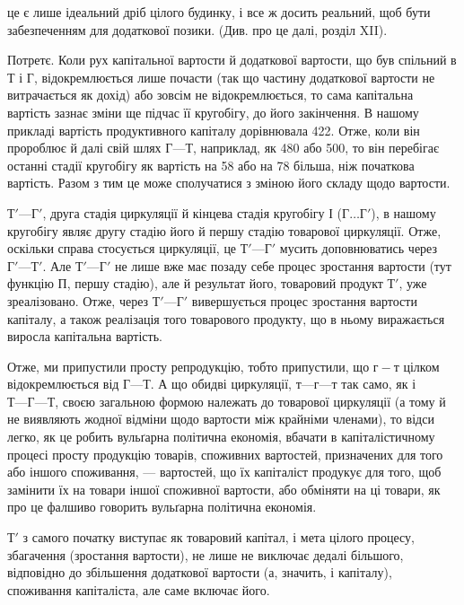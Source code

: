 \parcont{}  %
це є лише ідеальний дріб цілого будинку, і все ж досить реальний, щоб
бути забезпеченням для додаткової позики. (Див. про це далі, розділ XII).

Потретє. Коли рух капітальної вартости й додаткової вартости, що
був спільний в $Т$ і $Г$, відокремлюється лише почасти (так що частину
додаткової вартости не витрачається як дохід) або зовсім не відокремлюється,
то сама капітальна вартість зазнає зміни ще підчас її кругобігу,
до його закінчення. В нашому прикладі вартість продуктивного капіталу
дорівнювала 422. Отже, коли він пророблює й далі свій шлях
$Г — Т$, наприклад, як 480 або 500, то він перебігає
останні стадії кругобігу як вартість на 58 або на 78
більша, ніж початкова вартість. Разом з тим це може сполучатися з зміною
його складу щодо вартости.

$Т' — Г'$, друга стадія циркуляції й кінцева стадія кругобігу І ($ Г\dots{} Г'$),
в нашому кругобігу являє другу стадію його й першу стадію товарової
циркуляції. Отже, оскільки справа стосується циркуляції, це $Т' — Г'$ мусить
доповнюватись через $Г' — Т'$. Але $Т' — Г'$ не лише вже має позаду себе процес
зростання вартости (тут функцію $П$, першу стадію), але й результат його,
товаровий продукт $Т'$, уже зреалізовано. Отже, через $Т' — Г'$ вивершується
процес зростання вартости капіталу, а також реалізація того товарового продукту,
що в ньому виражається виросла капітальна вартість.

Отже, ми припустили просту репродукцію, тобто припустили, що
$г-т$ цілком відокремлюється від $Г — Т$. А що обидві циркуляції,
$т — г — т$ так само, як і $Т — Г — Т$, своєю загальною формою належать
до товарової циркуляції (а тому й не виявляють жодної відміни щодо
вартости між крайніми членами), то відси легко, як це робить вульґарна
політична економія, вбачати в капіталістичному процесі просту
продукцію товарів, споживних вартостей, призначених для того або іншого
споживання, — вартостей, що їх капіталіст продукує для того, щоб замінити
їх на товари іншої споживної вартости, або обміняти на ці товари, як
про це фалшиво говорить вульґарна політична економія.

$Т'$ з самого початку виступає як товаровий капітал, і мета цілого
процесу, збагачення (зростання вартости), не лише не виключає дедалі
більшого, відповідно до збільшення додаткової вартости (а, значить, і
капіталу), споживання капіталіста, але саме включає його.

